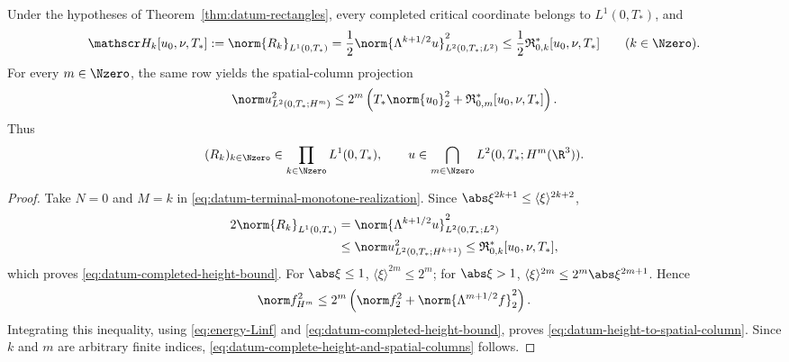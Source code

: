 \begin{corollary}
\label{cor:datum-critical-height-completion}
Under the hypotheses of Theorem~\ref{thm:datum-rectangles}, every completed
critical coordinate belongs to \(L^1(0,T_*)\), and
\begin{equation}
 \mathscr H_k[u_0,\nu,T_*]
 :=\norm{R_k}_{L^1(0,T_*)}
 =\frac12\norm{\Lambda^{k+1/2}u}_{L^2(0,T_*;L^2)}^2
 \le\frac12\mathfrak R_{0,k}^*[u_0,\nu,T_*]
 \qquad(k\in\Nzero).
 \label{eq:datum-completed-height-bound}
\end{equation}
For every \(m\in\Nzero\), the same row yields the spatial-column projection
\begin{equation}
 \norm u_{L^2(0,T_*;H^m)}^2
 \le
 2^m\left(
  T_*\norm{u_0}_2^2+\mathfrak R_{0,m}^*[u_0,\nu,T_*]
 \right).
 \label{eq:datum-height-to-spatial-column}
\end{equation}
Thus
\begin{equation}
 (R_k)_{k\in\Nzero}\in\prod_{k\in\Nzero}L^1(0,T_*),
 \qquad
 u\in\bigcap_{m\in\Nzero}L^2(0,T_*;H^m(\R^3)).
 \label{eq:datum-complete-height-and-spatial-columns}
\end{equation}
\end{corollary}

\begin{samepage}
\begin{proof}
Take \(N=0\) and \(M=k\) in
\eqref{eq:datum-terminal-monotone-realization}.  Since
\(\abs\xi^{2k+1}\le\langle\xi\rangle^{2k+2}\),
\begin{align*}
 2\norm{R_k}_{L^1(0,T_*)}
 &=\norm{\Lambda^{k+1/2}u}_{L^2(0,T_*;L^2)}^2\\
 &\le\norm u_{L^2(0,T_*;H^{k+1})}^2
 \le\mathfrak R_{0,k}^*[u_0,\nu,T_*],
\end{align*}
which proves \eqref{eq:datum-completed-height-bound}.  For
\(\abs\xi\le1\),
\(\langle\xi\rangle^{2m}\le2^m\); for \(\abs\xi>1\),
\(\langle\xi\rangle^{2m}\le2^m\abs\xi^{2m+1}\).  Hence
\[
 \norm f_{H^m}^2
 \le2^m\left(\norm f_2^2+
 \norm{\Lambda^{m+1/2}f}_2^2\right).
\]
Integrating this inequality, using
\eqref{eq:energy-Linf} and
\eqref{eq:datum-completed-height-bound}, proves
\eqref{eq:datum-height-to-spatial-column}.  Since \(k\) and \(m\) are
arbitrary finite indices, \eqref{eq:datum-complete-height-and-spatial-columns}
follows.
\end{proof}
\end{samepage}

